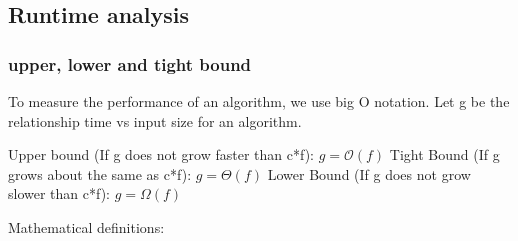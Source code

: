 \subsection{Runtime analysis}
    \subsubsection{upper, lower and tight bound}
    To measure the performance of an algorithm, we use big O notation.
    Let g be the relationship time vs input size for an algorithm.
    
    Upper bound (If g does not grow faster than c*f):
    $g=\mathcal{O}(f)$
    Tight Bound (If g grows about the same as c*f):
    $g= \Theta(f)$
    Lower Bound (If g does not grow slower than c*f):
    $g= \Omega(f)$
    
    Mathematical definitions:
    
    